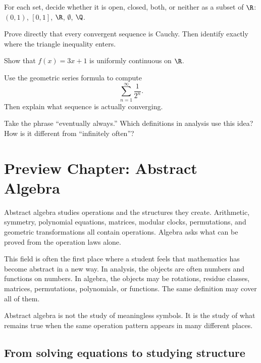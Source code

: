 \begin{exercise}
For each set, decide whether it is open, closed, both, or neither as a subset
of $\R$: $(0,1)$, $[0,1]$, $\R$, $\emptyset$, $\Q$.
\end{exercise}

\begin{exercise}
Prove directly that every convergent sequence is Cauchy. Then identify exactly
where the triangle inequality enters.
\end{exercise}

\begin{exercise}
Show that $f(x)=3x+1$ is uniformly continuous on $\R$.
\end{exercise}

\begin{exercise}
Use the geometric series formula to compute
\[
\sum_{n=1}^{\infty}\frac{1}{2^n}.
\]
Then explain what sequence is actually converging.
\end{exercise}

\begin{walkbox}
Take the phrase ``eventually always.'' Which definitions in analysis use this
idea? How is it different from ``infinitely often''?
\end{walkbox}

\section{Preview Chapter: Abstract Algebra}

Abstract algebra studies operations and the structures they create. Arithmetic,
symmetry, polynomial equations, matrices, modular clocks, permutations, and
geometric transformations all contain operations. Algebra asks what can be
proved from the operation laws alone.

This field is often the first place where a student feels that mathematics has
become abstract in a new way. In analysis, the objects are often numbers and
functions on numbers. In algebra, the objects may be rotations, residue classes,
matrices, permutations, polynomials, or functions. The same definition may cover
all of them.

\begin{focusbox}
Abstract algebra is not the study of meaningless symbols. It is the study of
what remains true when the same operation pattern appears in many different
places.
\end{focusbox}

\subsection{From solving equations to studying structure}

